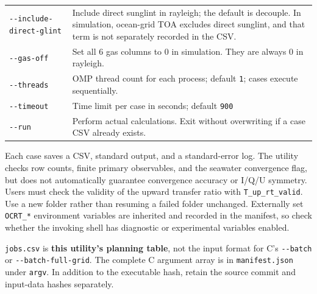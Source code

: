 {\begin{longtable}{@{}>{\raggedright\arraybackslash}p{}>{\raggedright\arraybackslash}p{}@{}}
\texttt{-\allowbreak{}-\allowbreak{}include-\allowbreak{}direct-\allowbreak{}glint} & Include direct sunglint in rayleigh; the default is decouple. In simulation, ocean-grid TOA excludes direct sunglint, and that term is not separately recorded in the CSV. \\
\texttt{-\allowbreak{}-\allowbreak{}gas-\allowbreak{}off} & Set all 6 gas columns to 0 in simulation. They are always 0 in rayleigh. \\
\texttt{-\allowbreak{}-\allowbreak{}threads} & OMP thread count for each process; default \texttt{1}; cases execute sequentially. \\
\texttt{-\allowbreak{}-\allowbreak{}timeout} & Time limit per case in seconds; default \texttt{900} \\
\texttt{-\allowbreak{}-\allowbreak{}run} & Perform actual calculations. Exit without overwriting if a case CSV already exists. \\
\end{longtable}
}

Each case saves a CSV, standard output, and a standard-error log. The utility checks row counts, finite primary observables, and the seawater convergence flag, but does not automatically guarantee convergence accuracy or I/Q/U symmetry. Users must check the validity of the upward transfer ratio with \texttt{T\_\allowbreak{}up\_\allowbreak{}rt\_\allowbreak{}valid}. Use a new folder rather than resuming a failed folder unchanged. Externally set \texttt{OCRT\_\allowbreak{}*} environment variables are inherited and recorded in the manifest, so check whether the invoking shell has diagnostic or experimental variables enabled.

\texttt{jobs.\allowbreak{}csv} is \textbf{this utility's planning table}, not the input format for C's \texttt{-\allowbreak{}-\allowbreak{}batch} or \texttt{-\allowbreak{}-\allowbreak{}batch-\allowbreak{}full-\allowbreak{}grid}. The complete C argument array is in \texttt{manifest.\allowbreak{}json} under \texttt{argv}. In addition to the executable hash, retain the source commit and input-data hashes separately.
\endgroup

